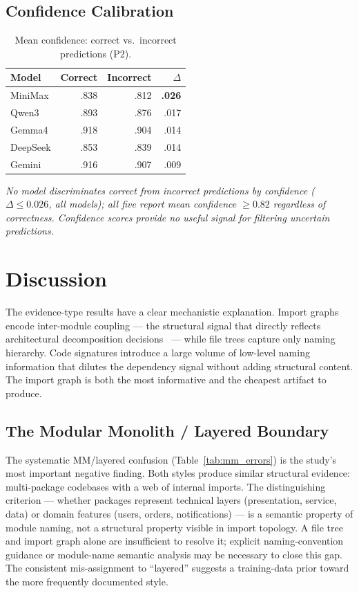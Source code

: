 \documentclass[runningheads]{llncs}
\begin{document}
\subsection{Confidence Calibration}
\label{sec:confidence}

\begin{table}[htbp]
\caption{Mean confidence: correct vs.\ incorrect predictions (P2).}
\label{tab:confidence}
\centering
\small
\begin{tabular}{lrrr}
\toprule
\textbf{Model} & \textbf{Correct} & \textbf{Incorrect} & \textbf{$\Delta$} \\
\midrule
MiniMax  & .838 & .812 & \textbf{.026} \\
Qwen3    & .893 & .876 & .017 \\
Gemma4   & .918 & .904 & .014 \\
DeepSeek & .853 & .839 & .014 \\
Gemini   & .916 & .907 & .009 \\
\bottomrule
\end{tabular}
\end{table}

\textit{No model discriminates correct from incorrect predictions by confidence ($\Delta \leq 0.026$, all models); all five report mean confidence $\geq 0.82$ regardless of correctness. Confidence scores provide no useful signal for filtering uncertain predictions.}

\section{Discussion}
\label{sec:discussion}

The evidence-type results have a clear mechanistic explanation. Import graphs encode inter-module coupling --- the structural signal that directly reflects architectural decomposition decisions~\cite{perry1992foundations} \cite{bass2021software} --- while file trees capture only naming hierarchy. Code signatures introduce a large volume of low-level naming information that dilutes the dependency signal without adding structural content. The import graph is both the most informative and the cheapest artifact to produce.

\subsection{The Modular Monolith / Layered Boundary}

The systematic MM/layered confusion (Table~\ref{tab:mm_errors}) is the study's most important negative finding. Both styles produce similar structural evidence: multi-package codebases with a web of internal imports. The distinguishing criterion --- whether packages represent technical layers (presentation, service, data) or domain features (users, orders, notifications) --- is a semantic property of module naming, not a structural property visible in import topology. A file tree and import graph alone are insufficient to resolve it; explicit naming-convention guidance or module-name semantic analysis may be necessary to close this gap. The consistent mis-assignment to ``layered'' suggests a training-data prior toward the more frequently documented style.
\end{document}
